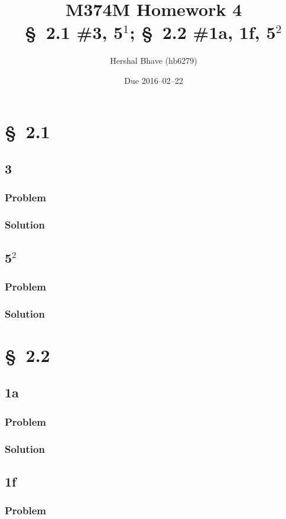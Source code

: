 \documentclass[12pt]{article}
\title{M374M Homework 4 \\
  \normalsize{\S~2.1 \#3, 5$^1$; \S~2.2 \#1a, 1f, 5$^2$}}
\author{Hershal Bhave (hb6279)}
\date{Due 2016--02--22}
\begin{document}
\maketitle
\section{\S~2.1}
\subsection{3}
\subsubsection*{Problem}
\subsubsection*{Solution}
\todo[]

\subsection{5$^2$}
\subsubsection*{Problem}
\subsubsection*{Solution}
\todo[]

\section{\S~2.2}
\subsection{1a}
\subsubsection*{Problem}
\subsubsection*{Solution}
\todo[]

\subsection{1f}
\subsubsection*{Problem}
\end{document}
